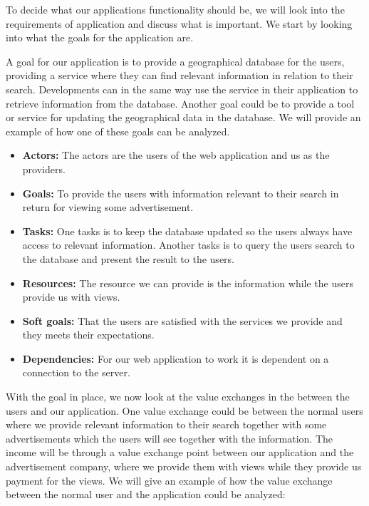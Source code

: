 To decide what our applications functionality should be, we will look into the requirements of application and discuss what is important. We start by looking into what the goals for the application are.

A goal for our application is to provide a geographical database for the users, providing a service where they can find relevant information in relation to their search. Developments can in the same way use the service in their application to retrieve information from the database. Another goal could be to provide a tool or service for updating the geographical data in the database. We will provide an example of how one of these goals can be analyzed.

\begin{itemize}

\item \textbf{Actors:} The actors are the users of the web application and us as the providers. 
\item \textbf{Goals:} To provide the users with information relevant to their search in return for viewing some advertisement.
\item \textbf{Tasks:} One tasks is to keep the database updated so the users always have access to relevant information. Another tasks is to query the users search to the database and present the result to the users.
\item \textbf{Resources:} The resource we can provide is the information while the users provide us with views.
\item \textbf{Soft goals:} That the users are satisfied with the services we provide and they meets their expectations.
\item \textbf{Dependencies:} For our web application to work it is dependent on a connection to the server.

\end{itemize}

With the goal in place, we now look at the value exchanges in the between the users and our application. One value exchange could be between the normal users where we provide relevant information to their search together with some advertisements which the users will see together with the information. The income will be through a value exchange point between our application and the advertisement company, where we provide them with views while they provide us payment for the views. We will give an example of how the value exchange between the normal user and the application could be analyzed:
 
